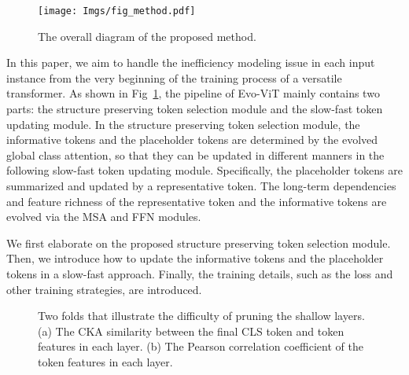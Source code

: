 \documentclass[letterpaper]{article} \usepackage{aaai22}  \usepackage{times}  \usepackage{helvet}  \usepackage{courier}  \usepackage[hyphens]{url}  \usepackage{graphicx} \urlstyle{rm} \def\UrlFont{\rm}  \usepackage{natbib}  \usepackage{caption} \DeclareCaptionStyle{ruled}{labelfont=normalfont,labelsep=colon,strut=off} \frenchspacing  \setlength{\pdfpagewidth}{8.5in}  \setlength{\pdfpageheight}{11in}  \usepackage{algorithm}
\begin{document}
\begin{figure}
    \centering
    \texttt{[image: Imgs/fig\_method.pdf]} \caption{The overall diagram of the proposed method.}
    \label{fig:method}
    \vspace{-4mm}
\end{figure} In this paper, we aim to handle the inefficiency modeling issue in each input instance from the very beginning of the training process of a versatile transformer. 
As shown in Fig~\ref{fig:method}, the pipeline of Evo-ViT mainly contains two parts: the structure preserving token selection module and the slow-fast token updating module. In the structure preserving token selection module, the informative tokens and the placeholder tokens are determined by the evolved global class attention, so that they can be updated in different manners in the following slow-fast token updating module. Specifically, the placeholder tokens are summarized and updated by a representative token. The long-term dependencies and feature richness of the representative token and the informative tokens are evolved via the MSA and FFN modules.  

We first elaborate on the proposed structure preserving token selection module. Then, we introduce how to update the informative tokens and the placeholder tokens in a slow-fast approach. Finally, the training details, such as the loss and other training strategies, are introduced.








\begin{figure}[t]
    \centering  {}
    \caption{Two folds that illustrate the difficulty of pruning the shallow layers. (a) The CKA similarity between the final CLS token and token features in each layer. (b) The Pearson correlation coefficient of the token features in each layer.}
    \label{fig:cor_analysis}
    \vspace{-5mm}
\end{figure} 
\end{document}
